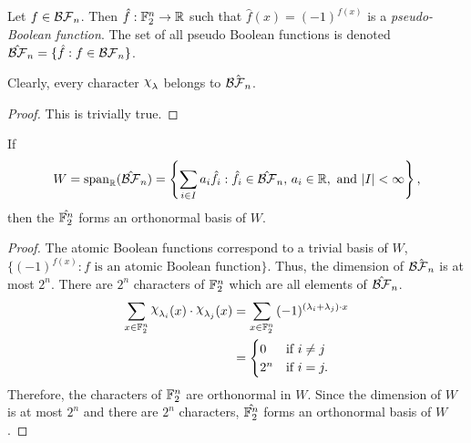 \begin{definition}\label{def:pBF}
  Let $f\in\mathcal{BF}_n$. Then $\hat{f}:\mathbb{F}_2^n\rightarrow\mathbb{R}$ such that
  $\hat{f}(x)=(-1)^{f(x)}$ is a \textit{pseudo-Boolean function}. The set of all
	pseudo Boolean functions is denoted $\hat{\mathcal{BF}}_n=\{\hat{f}:f\in\mathcal{BF}_n\}$.
\end{definition}
\begin{lemma}
\par Clearly, every character $\Chi_\lambda$ belongs to $\hat{\mathcal{BF}_n}$.
\end{lemma}
\begin{proof}
	\par This is trivially true.
\end{proof}
\begin{lemma}
  If \[W={\rm span}_\rrr(\hat{\BF}_n)=\left\{\sum_{i\in I}a_i\hat{f}_i:
  \hat{f}_i\in\hat{\BF}_n{\rm ,\ }a_i\in\rrr{\rm ,\ and\ }|I|<\infty\right\},\]
  then the $\hat{\mathbb{F}_2^n}$ forms an orthonormal basis of $W$.
\end{lemma}
\begin{proof}
	The atomic Boolean functions correspond to a trivial basis of $W$,
	$\{(-1)^{f(x)}:f \text{ is an atomic Boolean function}\}$. Thus, the dimension
	of $\hat{\mathcal{BF}_n}$ is at most $2^n$. There are $2^n$ characters of $\mathbb{F}_2^n$
	which are all elements of $\hat{\mathcal{BF}}_n$.
  \begin{align*}
    \sum_{x\in\gftwo^n}{\Chi_{\lambda_i}(x)\cdot\Chi_{\lambda_j}(x)}
    &=\sum_{x\in\gftwo^n}
      {(-1)^{(\lambda_i+\lambda_j)\cdot x}}\\
    &=\begin{cases}
      0 & \text{if } i\not=j \\
      2^n & \text{if } i=j.
    \end{cases}
  \end{align*}
  Therefore, the characters of $\mathbb{F}_2^n$ are orthonormal in $W$. Since the
	dimension of $W$ is at most $2^n$ and there are $2^n$ characters,
	$\hat{\mathbb{F}_2^n}$ forms an orthonormal basis of $W$.
\end{proof}


